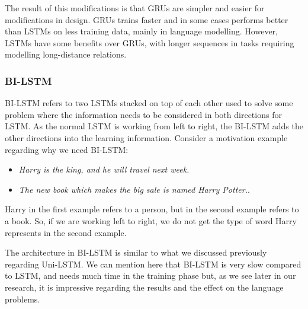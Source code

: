 The result of this modifications is that GRUs are simpler and easier for modifications in design. GRUs trains faster and in some cases performs better than LSTMs on less training data, mainly in language modelling. However, LSTMs have some benefits over GRUs, with longer sequences in tasks requiring modelling long-distance relations.

\subsubsection{BI-LSTM}\label{Sec:Bi_Lstm}

BI-LSTM refers to two LSTMs stacked on top of each other used to solve some problem where the information needs to be considered in both directions for LSTM. As the normal LSTM is working from left to right, the BI-LSTM adds the other directions into the learning information. Consider a motivation example regarding why we need BI-LSTM:

\begin{itemize}
\item \textit{Harry is the king, and he will travel next week.}
\item \textit{The new book which makes the big sale is named Harry Potter.}.
\end{itemize}

Harry in the first example refers to a person, but in the second example refers to a book. So, if we are working left to right, we do not get the type of word Harry represents in the second example.

The architecture in BI-LSTM is similar to what we discussed previously regarding Uni-LSTM. We can mention here that BI-LSTM is very slow compared to LSTM, and needs much time in the training phase but, as we see later in our research, it is impressive regarding the results and the effect on the language problems.

